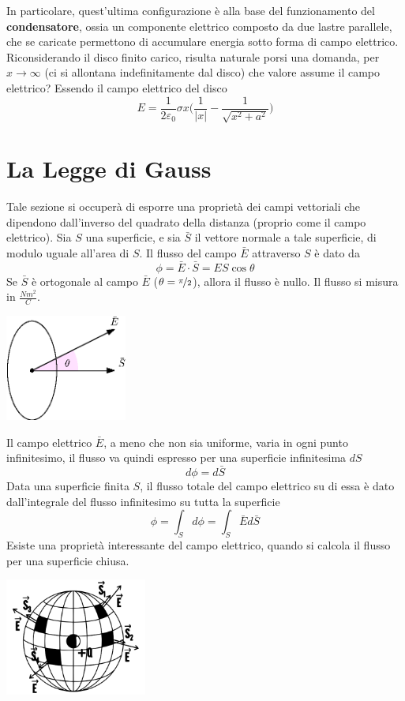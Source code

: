 \documentclass[10pt, letterpaper]{report}
\begin{document}
In particolare, quest'ultima configurazione è alla base del funzionamento del \textbf{condensatore}, ossia un componente elettrico composto da due lastre parallele, che se caricate permettono di accumulare energia sotto forma di campo elettrico.\acc 
Riconsiderando il disco finito carico, risulta naturale porsi una domanda, per $x\rightarrow \infty$ (ci si allontana indefinitamente dal disco) che valore assume il campo elettrico? Essendo il campo elettrico del disco 
$$ E=\frac{1}{2\varepsilon_0}\sigma x\Big( \frac{1}{|x|}-\frac{1}{\sqrt{x^2+a^2}} \Big)$$
\flowerLine 
\section{La Legge di Gauss}
Tale sezione si occuperà di esporre una proprietà dei campi vettoriali che dipendono dall'inverso del quadrato della distanza (proprio come il campo elettrico).\acc 
{} Sia $S$ una superficie, e sia $\bar S$ il vettore normale a tale superficie, di modulo uguale all'area di $S$. Il flusso del campo $\bar E$ attraverso $S$ è dato da 
$$ \phi=\bar E\cdot \bar S=ES\cos\theta$$
Se  $\bar S$ è ortogonale al campo $\bar E$ ($\theta = \nicefrac{\pi}{2}$), allora il flusso è nullo. Il flusso si misura in $\frac{Nm^2}{C}$.  \begin{center}
    \includegraphics[width=0.3\textwidth]{images/flusso.eps}
\end{center}
Il campo elettrico $\bar E$, a meno che non sia uniforme, varia in ogni punto infinitesimo, il flusso va quindi espresso per una superficie infinitesima $dS$
$$ d\phi=d\bar S$$
Data una superficie finita $S$, il flusso totale del campo elettrico su di essa è dato dall'integrale del flusso infinitesimo su tutta la superficie 
$$ \phi = \int_S d\phi = \int_S \bar Ed\bar S$$
Esiste una proprietà interessante del campo elettrico, quando si calcola il flusso per una superficie chiusa. \begin{center}
    \includegraphics[width=0.35\textwidth]{images/Gauss.pdf}
\end{center}
\end{document}
